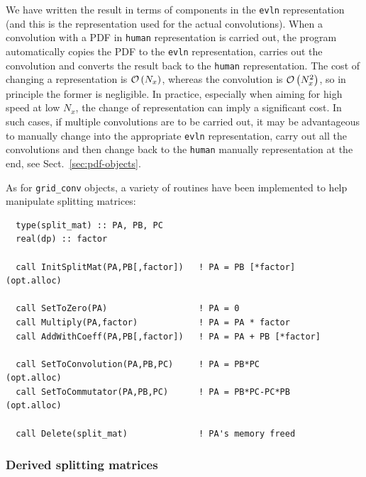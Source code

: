 \documentclass[12pt]{article}
\newcommand{\ttt}[1]{\texttt{#1}}
\newcommand{\order}[1]{{\cal O}\left(#1\right)}
\begin{document}
We have written the result in terms of components in the \ttt{evln}
representation (and this is the representation used for the actual
convolutions). When a convolution with a PDF in \ttt{human}
representation is carried out, the program automatically copies the
PDF to the \ttt{evln} representation, carries out the convolution and
converts the result back to the \ttt{human} representation.
%
The cost of changing a representation is $\order{N_x}$, whereas the
convolution is $\order{N^2_x}$, so in principle the former is
negligible. In practice, especially when aiming for high speed at low
$N_x$, the change of representation can imply a significant cost. In
such cases, if multiple convolutions are to be carried out, it may be
advantageous to manually change into the appropriate \ttt{evln}
representation, carry out all the convolutions and then change back to
the \ttt{human} manually representation at the end, see
Sect.~\ref{sec:pdf-objects}.
%

As for \ttt{grid\_conv} objects, a variety of routines have been
implemented to help manipulate splitting matrices:
\begin{lstlisting}
  type(split_mat) :: PA, PB, PC
  real(dp) :: factor

  call InitSplitMat(PA,PB[,factor])   ! PA = PB [*factor]   (opt.alloc)

  call SetToZero(PA)                  ! PA = 0
  call Multiply(PA,factor)            ! PA = PA * factor               
  call AddWithCoeff(PA,PB[,factor])   ! PA = PA + PB [*factor]

  call SetToConvolution(PA,PB,PC)     ! PA = PB*PC          (opt.alloc)
  call SetToCommutator(PA,PB,PC)      ! PA = PB*PC-PC*PB    (opt.alloc)
  
  call Delete(split_mat)              ! PA's memory freed
\end{lstlisting}


\subsubsection{Derived splitting matrices}
\label{sec:derived-split-matrices}
\end{document}
